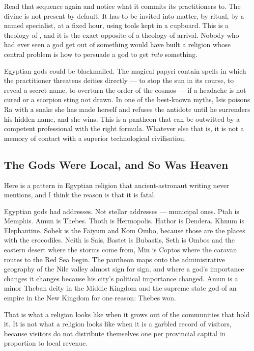 Read that sequence again and notice what it commits its practitioners to. The divine is not
present by default. It has to be invited into matter, by ritual, by a named specialist, at a
fixed hour, using tools kept in a cupboard. This is a theology of , and it is the
exact opposite of a theology of arrival. Nobody who had ever seen a god get out of something
would have built a religion whose central problem is how to persuade a god to get \emph{into}
something.

\begin{funfact}
Egyptian gods could be blackmailed. The magical papyri contain spells in which the practitioner
threatens deities directly --- to stop the sun in its course, to reveal a secret name, to overturn
the order of the cosmos --- if a headache is not cured or a scorpion sting not drawn. In one of
the best-known myths, Isis poisons Ra with a snake she has made herself and refuses the antidote
until he surrenders his hidden name, and she wins. This is a pantheon that can be outwitted by a
competent professional with the right formula. Whatever else that is, it is not a memory of
contact with a superior technological civilisation.
\end{funfact}

\subsection{The Gods Were Local, and So Was Heaven}\label{sec:localgods}

Here is a pattern in Egyptian religion that ancient-astronaut writing never mentions, and I think
the reason is that it is fatal.

Egyptian gods had addresses. Not stellar addresses --- municipal ones. Ptah is Memphis. Amun is
Thebes. Thoth is Hermopolis. Hathor is Dendera. Khnum is Elephantine. Sobek is the Faiyum and
Kom Ombo, because those are the places with the crocodiles. Neith is Sais, Bastet is Bubastis,
Seth is Ombos and the eastern desert where the storms come from, Min is Coptos where the caravan
routes to the Red Sea begin. The pantheon maps onto the administrative geography of the Nile
valley almost sign for sign, and where a god's importance changes it changes because his city's
political importance changed. Amun is a minor Theban deity in the Middle Kingdom and the supreme
state god of an empire in the New Kingdom for one reason: Thebes won.

 That is what a religion looks like when it grows out of the
communities that hold it. It is not what a religion looks like when it is a garbled record of
visitors, because visitors do not distribute themselves one per provincial capital in proportion
to local revenue.

